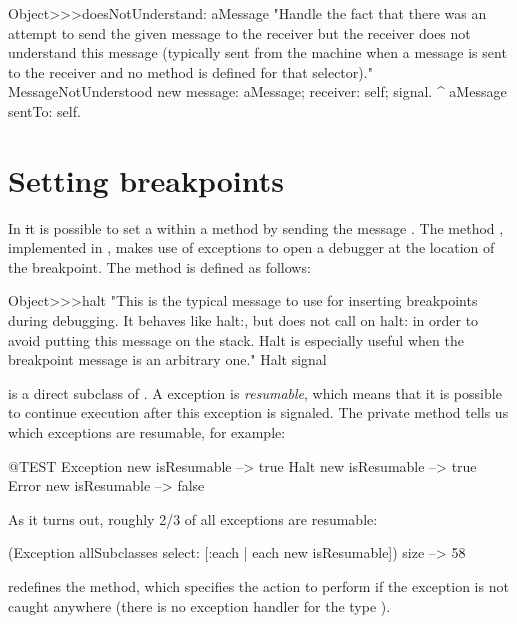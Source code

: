 \documentclass[a4paper,10pt,twoside]{book}
\begin{document}
\begin{code}{}
Object>>>doesNotUnderstand: aMessage 
	 "Handle the fact that there was an attempt to send the given message to the receiver but the receiver does not understand this message (typically sent from the machine when a message is sent to the receiver and no method is defined for that selector)."
	MessageNotUnderstood new 
		message: aMessage;
		receiver: self;
		signal.
	^ aMessage sentTo: self.
\end{code}

\section{Setting breakpoints}

In \st it is possible to set a  within a method by sending the message . The method , implemented in , makes use of exceptions to open a debugger at the location of the breakpoint.
The method  is defined as follows:

\begin{code}{}
Object>>>halt
	"This is the typical message to use for inserting breakpoints during 
	debugging. It behaves like halt:, but does not call on halt: in order to 
	avoid putting this message on the stack. Halt is especially useful when 
	the breakpoint message is an arbitrary one."
	Halt signal
\end{code}

 is a direct subclass of . A  exception is \emph{resumable}, which means that it is possible to continue execution after this exception is signaled. The private  method  tells us which exceptions are resumable, for example:
\begin{code}{@TEST}
Exception new isResumable --> true
Halt new isResumable          --> true
Error new isResumable         --> false
\end{code}

As it turns out, roughly 2/3 of all exceptions are resumable:
\begin{code}{}
(Exception allSubclasses select: [:each | each new isResumable]) size --> 58
\end{code}

 redefines the  method, which specifies the action to perform if the exception is not caught anywhere (\ie there is no exception handler for the type ).
\end{document}
